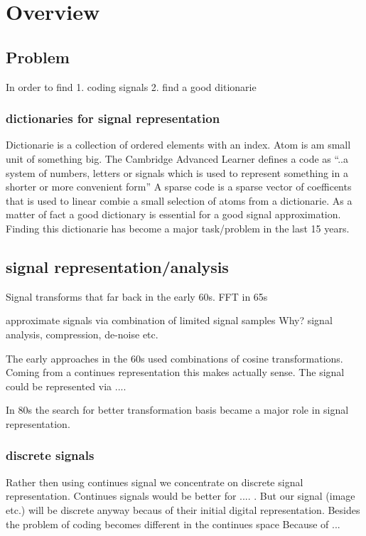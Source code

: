 \chapter{Overview}

\section{Problem}
In order to find 
1. coding signals 
2. find a good ditionarie

\subsection{dictionaries for signal representation}
Dictionarie is a collection of ordered elements with an index.
Atom is am small unit of something big.
The Cambridge Advanced Learner defines a code as ``..a system of numbers, letters or signals which is used to represent something in a shorter or more convenient form''
A sparse code is a sparse vector of coefficents that is used to linear combie a small selection of atoms from a dictionarie.
As a matter of fact a good dictionary is essential for a good signal approximation. \cite{} Finding this dictionarie has become a major task/problem in the last 15 years.

\section{signal representation/analysis}
Signal transforms \cite{sparse intro} that far back in the early 60s.
FFT in 65s

approximate signals via combination of limited signal samples
Why?
signal analysis, compression, de-noise etc.

The early approaches in the 60s used combinations of cosine transformations. Coming from a continues representation this makes 
actually sense. The signal could be represented via ....

In 80s the search for better transformation basis became a major role in signal representation. \cite{}

\subsection{discrete signals}
Rather then using continues signal we concentrate on discrete signal representation.
Continues signals would be better for .... . But our signal (image etc.) will be discrete anyway becaus of their initial digital representation. 
Besides the problem of coding becomes different in the continues space \cite{} Because of ...

